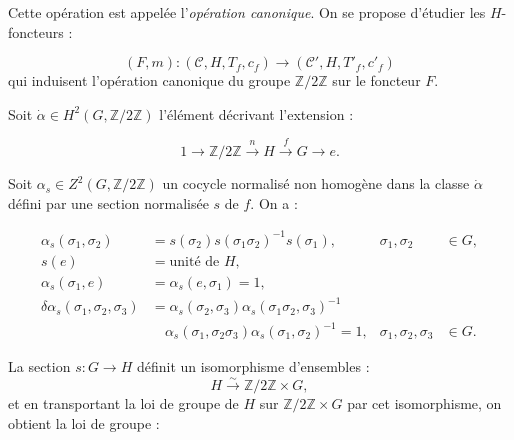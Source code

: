 %
Cette opération est appelée l'\emph{opération canonique}. On se propose
d'étudier les $H$-foncteurs :

\begin{equation}
  (F,m)\colon(\mathcal C,H,T_f,c_f)
  \longrightarrow(\mathcal C',H,T'_f,c'_f)
  \tag{1.4.3.3}
\end{equation}
qui induisent l'opération canonique du groupe $\mathbb Z/2\mathbb Z$
sur le foncteur $F$.

Soit $\dot\alpha\in H^2(G,\mathbb Z/2\mathbb Z)$ l'élément décrivant
l'extension :

\begin{equation}
  1\longrightarrow\mathbb Z/2\mathbb Z
  \xrightarrow{n}H\xrightarrow{f}G\longrightarrow e.
  \tag{1.4.3.4}
\end{equation}

Soit $\alpha_s\in Z^2(G,\mathbb Z/2\mathbb Z)$ un cocycle normalisé
non homogène dans la classe $\dot\alpha$ défini par une section
normalisée $s$ de $f$. On a :

\begin{equation}
  \begin{aligned}
    \alpha_s(\sigma_1,\sigma_2)
      &=s(\sigma_2)s(\sigma_1\sigma_2)^{-1}s(\sigma_1),
      & \sigma_1,\sigma_2&\in G,\\
    s(e)&=\text{unité de }H,\\
    \alpha_s(\sigma_1,e)&=\alpha_s(e,\sigma_1)=1,\\
    \delta\alpha_s(\sigma_1,\sigma_2,\sigma_3)
      &=\alpha_s(\sigma_2,\sigma_3)
        \alpha_s(\sigma_1\sigma_2,\sigma_3)^{-1}\\
      &\quad{}\alpha_s(\sigma_1,\sigma_2\sigma_3)
        \alpha_s(\sigma_1,\sigma_2)^{-1}=1,
      & \sigma_1,\sigma_2,\sigma_3&\in G.
  \end{aligned}
  \tag{1.4.3.5}
\end{equation}

La section $s\colon G\to H$ définit un isomorphisme d'ensembles :
\[
  H\xrightarrow{\sim}\mathbb Z/2\mathbb Z\times G,
\]
et en transportant la loi de groupe de $H$ sur
$\mathbb Z/2\mathbb Z\times G$ par cet isomorphisme, on obtient la loi
de groupe :

